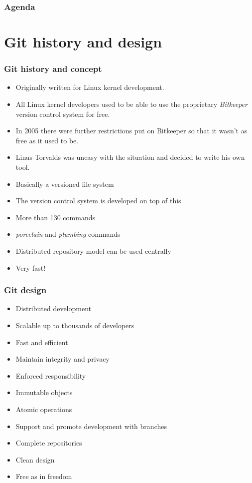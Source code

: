 \documentclass{gittalk}
\begin{document}

\begin{frame}
  \frametitle{Agenda}
  \tableofcontents
\end{frame}

\section{Git history and design}

\begin{frame}
\frametitle{Git history and concept}
\begin{itemize}
  \item Originally written for Linux kernel development.
  \item All Linux kernel developers used to be able to use the proprietary
        \emph{Bitkeeper} version control system for free.
  \item In 2005 there were further restrictions put on Bitkeeper so that
        it wasn't as free as it used to be.
  \item Linus Torvalds was uneasy with the situation and decided to write his
        own tool.
\end{itemize}
\vspace*{1em}
\begin{itemize}
  \item Basically a versioned file system
  \item The version control system is developed on top of this
  \item More than 130 commands
  \item \emph{porcelain} and \emph{plumbing} commands
  \item Distributed repository model can be used centrally
  \item Very fast!
\end{itemize}

\end{frame}

\begin{frame}
\frametitle{Git design}
\begin{itemize}
  \item Distributed development
  \item Scalable up to thousands of developers
  \item Fast and efficient
  \item Maintain integrity and privacy
  \item Enforced responsibility
  \item Immutable objects
  \item Atomic operations
  \item Support and promote development with branches
  \item Complete repositories
  \item Clean design
  \item Free as in freedom
\end{itemize}
\end{frame}
\end{document}
